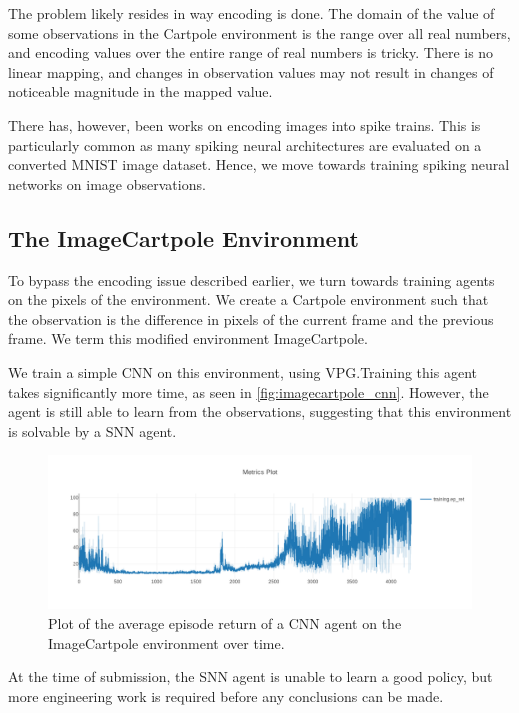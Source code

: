 \documentclass[fyp]{socreport}
\begin{document}
The problem likely resides in way encoding is done. The domain of the value of
some observations in the Cartpole environment is the range over all real
numbers, and encoding values over the entire range of real numbers is
tricky. There is no linear mapping, and changes in observation values may not
result in changes of noticeable magnitude in the mapped value.

There has, however, been works on encoding images into spike trains.  This is
particularly common as many spiking neural architectures are evaluated on a
converted MNIST image dataset. Hence, we move towards training spiking neural
networks on image observations.

\subsection{The ImageCartpole Environment}

To bypass the encoding issue described earlier, we turn towards training agents
on the pixels of the environment. We create a Cartpole environment such that the
observation is the difference in pixels of the current frame and the previous
frame. We term this modified environment ImageCartpole.

We train a simple CNN on this environment, using VPG.\@ Training this agent takes
significantly more time, as seen in \autoref{fig:imagecartpole_cnn}. However,
the agent is still able to learn from the observations, suggesting that this
environment is solvable by a SNN agent.

\begin{figure}[htbp] \centering
\includegraphics[width=.9\linewidth]{images/imagecartpole_cnn.png}
\caption{\label{fig:imagecartpole_cnn} Plot of the average episode return of a
CNN agent on the ImageCartpole environment over time.}
\end{figure}

At the time of submission, the SNN agent is unable to learn a good policy, but
more engineering work is required before any conclusions can be made.
\end{document}
